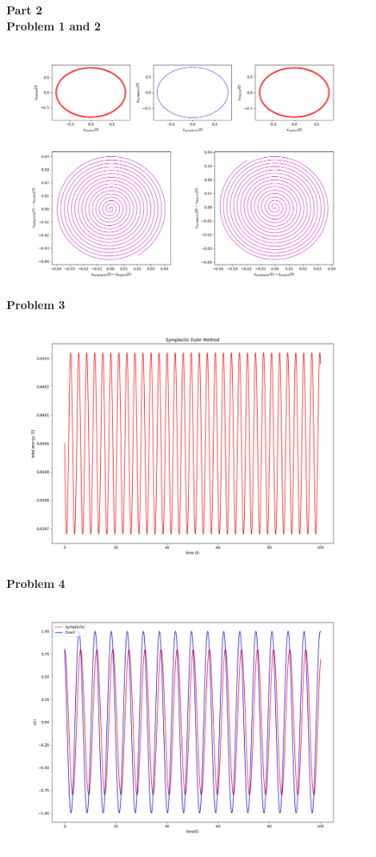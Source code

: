 \documentclass[12pt]{article}
\begin{document}
	\noindent\textbf{\large Part 2}\\
	
	\indent\textbf{Problem 1 and 2}\\
			\includegraphics[width=0.9\textwidth]{phaseSpace.png}\\

	\indent\textbf{Problem 3}\\
		\includegraphics[width=0.9\textwidth]{energySymplecticPlot.png}\\
	
	\indent\textbf{Problem 4}\\
		\includegraphics[width=0.9\textwidth]{vSymPlot.png}\\
		
\end{document}
